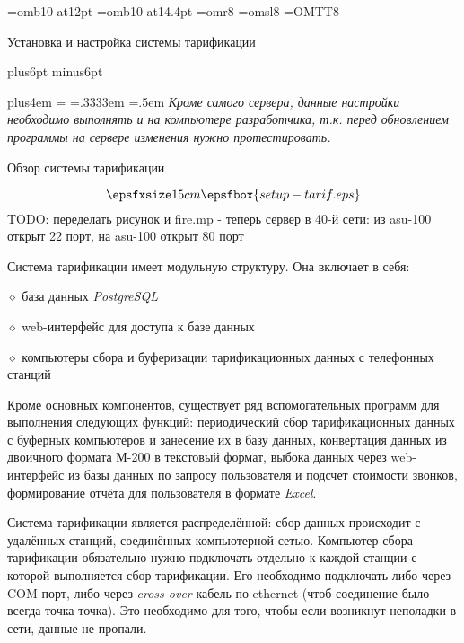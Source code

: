 

\parindent=30pt
\raggedbottom
{}

\font\bbf=omb10 at12pt %
\font\bbbf=omb10 at14.4pt %
\font\rmsmall=omr8
\font\slsmall=omsl8
\font\ttsmall=OMTT8

\newcount\secnum
\newcount\subsecnum

\def\raggedcenter{\leftskip=0pt plus4em \rightskip=\leftskip
  \parfillskip=0pt \spaceskip=.3333em \xspaceskip=.5em
  \pretolerance=9999 \tolerance=9999 \parindent=0pt
  \hyphenpenalty=9999 \exhyphenpenalty=9999 }

\rightline{\rmsmall\today\ \hours}
\nobreak\medskip
\centerline{\bbbf Установка и настройка системы тарификации}
\nobreak
\vskip18pt plus6pt minus6pt

\vbox{\raggedcenter\it Кроме самого сервера, данные настройки необходимо выполнять и на компьютере разработчика, т.к. перед обновлением программы на сервере изменения нужно протестировать.}
\bigskip

\newcount\n
\def\N{\advance\n by1\indent\hbox to0pt{\hskip-\parindent\bf\the\n.\hfil}}

\sec Обзор системы тарификации

$$\epsfxsize 15cm \epsfbox{setup-tarif.eps}$$
TODO: переделать рисунок и fire.mp - теперь сервер в 40-й сети: из asu-100 открыт 22 порт,
на asu-100 открыт 80 порт
\parskip=5pt

\noindent
Система тарификации имеет модульную структуру. Она включает в себя:
\item{$\diamond$} база данных {\it PostgreSQL}
\item{$\diamond$} web-интерфейс для доступа к базе данных
\item{$\diamond$} компьютеры сбора и буферизации тарификационных данных с телефонных станций

\noindent
Кроме основных компонентов, существует ряд вспомогательных программ для выполнения следующих функций: периодический сбор тарификационных данных с буферных компьютеров и занесение их в базу данных, конвертация данных из двоичного формата М-200 в текстовый формат, выбока данных через web-интерфейс из базы данных по запросу пользователя и подсчет стоимости звонков, формирование отчёта для пользователя в формате {\it Excel}.

\noindent
Система тарификации является распределённой: сбор данных происходит с удалённых станций, соединённых компьютерной сетью.
Компьютер сбора тарификации обязательно нужно подключать отдельно к каждой станции с которой выполняется сбор тарификации. Его необходимо подключать либо через COM-порт, либо через {\sl cross-over} кабель по ethernet (чтоб соединение было всегда точка-точка). Это необходимо для того, чтобы если возникнут неполадки в сети, данные не пропали.

